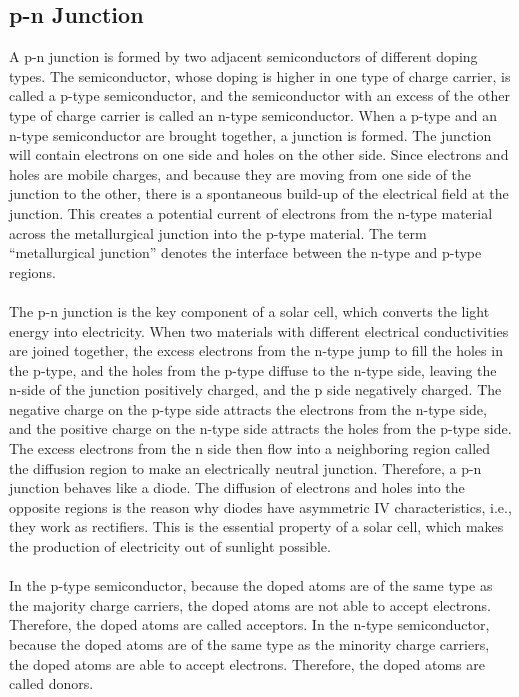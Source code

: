 \documentclass{report}
\begin{document}
\subsection{p-n Junction}
A p-n junction is formed by two adjacent semiconductors of different doping types.
The semiconductor, whose doping is higher in one type of charge carrier, is called a p-type semiconductor, and the semiconductor with an excess of the other type of charge carrier is called an n-type semiconductor.
When a p-type and an n-type semiconductor are brought together, a junction is formed. The junction will contain electrons on one side and holes on the other side. Since electrons and holes are mobile charges, and because they are moving from one side of the junction to the other, there is a spontaneous build-up of the electrical field at the junction.  This creates a potential current of electrons from the n-type material across the metallurgical junction into the p-type material. The term “metallurgical junction” denotes the interface between the n-type and p-type regions. \\
\\
The p-n junction is the key component of a solar cell, which converts the light energy into electricity. When two materials with different electrical conductivities are joined together, the excess electrons from the n-type jump to fill the holes in the p-type, and the holes from the p-type diffuse to the n-type side, leaving the n-side of the junction positively charged, and the p side negatively charged. The negative charge on the p-type side attracts the electrons from the n-type side, and the positive charge on the n-type side attracts the holes from the p-type side. The excess electrons from the n side then flow into a neighboring region called the diffusion region to make an electrically neutral junction. Therefore, a p-n junction behaves like a diode. The diffusion of electrons and holes into the opposite regions is the reason why diodes have asymmetric IV characteristics, i.e., they work as rectifiers. This is the essential property of a solar cell, which makes the production of electricity out of sunlight possible. \\
\\
In the p-type semiconductor, because the doped atoms are of the same type as the majority charge carriers, the doped atoms are not able to accept electrons. Therefore, the doped atoms are called acceptors. In the n-type semiconductor, because the doped atoms are of the same type as the minority charge carriers, the doped atoms are able to accept electrons. Therefore, the doped atoms are called donors\cite{bib1}. \\
\end{document}
